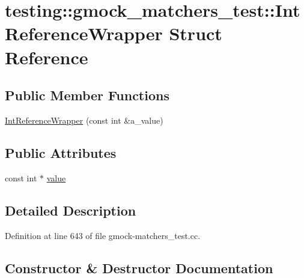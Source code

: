 \hypertarget{structtesting_1_1gmock__matchers__test_1_1_int_reference_wrapper}{}\section{testing\+:\+:gmock\+\_\+matchers\+\_\+test\+:\+:Int\+Reference\+Wrapper Struct Reference}
\label{structtesting_1_1gmock__matchers__test_1_1_int_reference_wrapper}
\subsection*{Public Member Functions}
\begin{DoxyCompactItemize}
\item 
\hyperlink{structtesting_1_1gmock__matchers__test_1_1_int_reference_wrapper_a9094df655096520977e13d620fbf7be7}{Int\+Reference\+Wrapper} (const int \&a\+\_\+value)
\end{DoxyCompactItemize}
\subsection*{Public Attributes}
\begin{DoxyCompactItemize}
\item 
const int $\ast$ \hyperlink{structtesting_1_1gmock__matchers__test_1_1_int_reference_wrapper_ac8fcb05733aa1fdb6c5236731b236cf6}{value}
\end{DoxyCompactItemize}


\subsection{Detailed Description}


Definition at line 643 of file gmock-\/matchers\+\_\+test.\+cc.



\subsection{Constructor \& Destructor Documentation}
